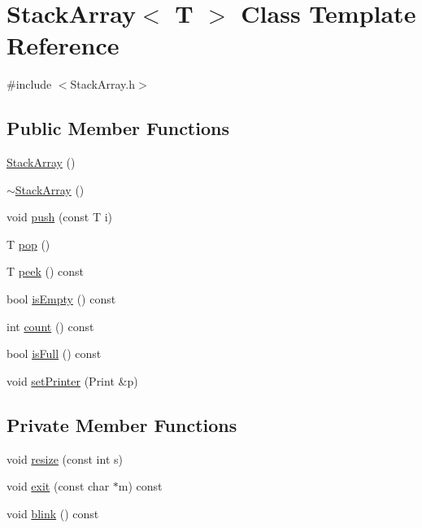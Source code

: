 \hypertarget{class_stack_array}{}\section{Stack\+Array$<$ T $>$ Class Template Reference}
\label{class_stack_array}


{\ttfamily \#include $<$Stack\+Array.\+h$>$}

\subsection*{Public Member Functions}
\begin{DoxyCompactItemize}
\item 
\mbox{\hyperlink{class_stack_array_ac92cb0c4d8256fa3d116cd3d037d60c4}{Stack\+Array}} ()
\item 
\mbox{\hyperlink{class_stack_array_a1e0a11a247341ce75f2f0e44c5f40581}{$\sim$\+Stack\+Array}} ()
\item 
void \mbox{\hyperlink{class_stack_array_a838249a39ed9e67b933620083480281f}{push}} (const T i)
\item 
T \mbox{\hyperlink{class_stack_array_a22dc3218512c550170cc5aa810b039ab}{pop}} ()
\item 
T \mbox{\hyperlink{class_stack_array_af044917811a2072e0182aa3062d5f95a}{peek}} () const
\item 
bool \mbox{\hyperlink{class_stack_array_a2121b2faf37e6c109557e78dfb90f875}{is\+Empty}} () const
\item 
int \mbox{\hyperlink{class_stack_array_a42cd43082e2c069f31002c54808a8876}{count}} () const
\item 
bool \mbox{\hyperlink{class_stack_array_a155f697a9ab24f060f18866a67425c52}{is\+Full}} () const
\item 
void \mbox{\hyperlink{class_stack_array_ae33d213467bb0cce1b103b99065cc8a3}{set\+Printer}} (Print \&p)
\end{DoxyCompactItemize}
\subsection*{Private Member Functions}
\begin{DoxyCompactItemize}
\item 
void \mbox{\hyperlink{class_stack_array_ac308bbdd64acd84afbacb3537bdd36a9}{resize}} (const int s)
\item 
void \mbox{\hyperlink{class_stack_array_a0253a4feadf1236bcdde253196878b23}{exit}} (const char $\ast$m) const
\item 
void \mbox{\hyperlink{class_stack_array_a3f1d4f8e8bc52b5dfea459b57c40af41}{blink}} () const
\end{DoxyCompactItemize}
